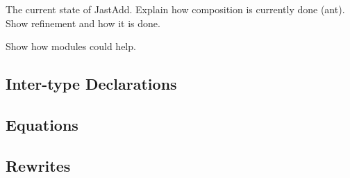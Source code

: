 

The current state of JastAdd\cite{jastadd}. Explain how composition is currently done (ant).
Show refinement and how it is done. 

Show how modules could help.

\subsection{Inter-type Declarations}

\subsection{Equations}

\subsection{Rewrites}
